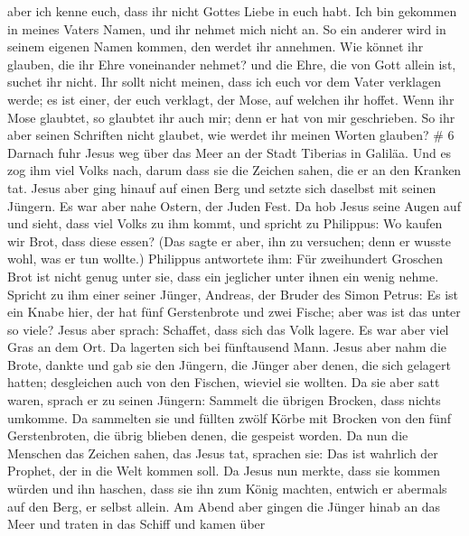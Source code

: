  aber ich kenne euch, dass ihr nicht Gottes Liebe in euch
habt.  Ich bin gekommen in meines Vaters Namen, und ihr
nehmet mich nicht an. So ein anderer wird in seinem eigenen Namen
kommen, den werdet ihr annehmen.  Wie könnet ihr glauben,
die ihr Ehre voneinander nehmet? und die Ehre, die von Gott allein ist,
suchet ihr nicht.  Ihr sollt nicht meinen, dass ich euch
vor dem Vater verklagen werde; es ist einer, der euch verklagt, der
Mose, auf welchen ihr hoffet.  Wenn ihr Mose glaubtet, so
glaubtet ihr auch mir; denn er hat von mir geschrieben.  So
ihr aber seinen Schriften nicht glaubet, wie werdet ihr meinen Worten
glauben? \# 6  Darnach fuhr Jesus weg über das Meer an der
Stadt Tiberias in Galiläa.  Und es zog ihm viel Volks nach,
darum dass sie die Zeichen sahen, die er an den Kranken tat.
 Jesus aber ging hinauf auf einen Berg und setzte sich
daselbst mit seinen Jüngern.  Es war aber nahe Ostern, der
Juden Fest.  Da hob Jesus seine Augen auf und sieht, dass
viel Volks zu ihm kommt, und spricht zu Philippus: Wo kaufen wir Brot,
dass diese essen?  (Das sagte er aber, ihn zu versuchen;
denn er wusste wohl, was er tun wollte.)  Philippus
antwortete ihm: Für zweihundert Groschen Brot ist nicht genug unter sie,
dass ein jeglicher unter ihnen ein wenig nehme.  Spricht zu
ihm einer seiner Jünger, Andreas, der Bruder des Simon Petrus:
 Es ist ein Knabe hier, der hat fünf Gerstenbrote und zwei
Fische; aber was ist das unter so viele?  Jesus aber
sprach: Schaffet, dass sich das Volk lagere. Es war aber viel Gras an
dem Ort. Da lagerten sich bei fünftausend Mann.  Jesus aber
nahm die Brote, dankte und gab sie den Jüngern, die Jünger aber denen,
die sich gelagert hatten; desgleichen auch von den Fischen, wieviel sie
wollten.  Da sie aber satt waren, sprach er zu seinen
Jüngern: Sammelt die übrigen Brocken, dass nichts umkomme. 
Da sammelten sie und füllten zwölf Körbe mit Brocken von den fünf
Gerstenbroten, die übrig blieben denen, die gespeist worden.
 Da nun die Menschen das Zeichen sahen, das Jesus tat,
sprachen sie: Das ist wahrlich der Prophet, der in die Welt kommen soll.
 Da Jesus nun merkte, dass sie kommen würden und ihn
haschen, dass sie ihn zum König machten, entwich er abermals auf den
Berg, er selbst allein.  Am Abend aber gingen die Jünger
hinab an das Meer  und traten in das Schiff und kamen über
